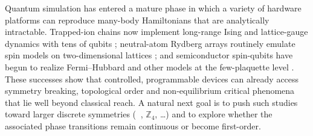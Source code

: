 \documentclass[reprint, aps, prx, amsmath, amssymb, longbibliography, superscriptaddress]{revtex4-2}
\DeclareMathOperator{\Zthree}{\mathbb{Z}_3}
\begin{document}
Quantum simulation has entered a mature phase in which a variety of hardware platforms can reproduce many-body Hamiltonians that are analytically intractable. Trapped-ion chains now implement long-range Ising and lattice-gauge dynamics with tens of qubits \cite{tan_domainwall_2021, kyprianidis_observation_2021,brydges_probing_2019,zhang_observation_2017,martinez_realtime_2016,meth_simulating_2025}; neutral-atom Rydberg arrays routinely emulate spin models on two-dimensional lattices \cite{madjarov_highfidelity_2020,semeghini_probing_2021,scholl_quantum_2021,manovitz_quantum_2025,bernien_probing_2017}; and semiconductor spin-qubits have begun to realize Fermi–Hubbard and other models at the few-plaquette level \cite{dehollain_nagaoka_2020, hensgens_quantum_2017, kiczynski_engineering_2022, vandiepen_quantum_2021, wang_experimental_2022, wang_probing_2023}. These successes show that controlled, programmable devices can already access symmetry breaking, topological order and non-equilibrium critical phenomena that lie well beyond classical reach. A natural next goal is to push such studies toward larger discrete symmetries ($\Zthree$, $\mathbb{Z}_4$, …) and to explore whether the associated phase transitions remain continuous or become first-order.
\end{document}
